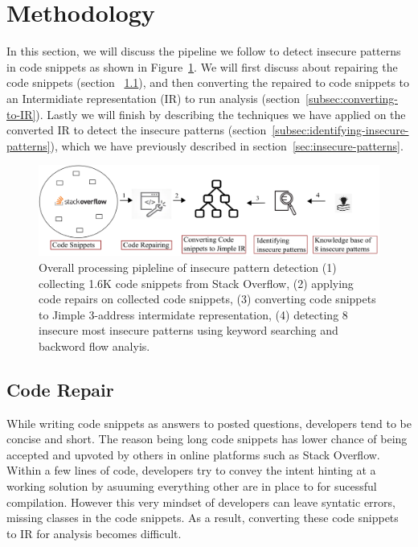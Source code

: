 \section{Methodology}
\label{sec:methodology}
In this section, we will discuss the pipeline we follow to detect insecure patterns in code snippets as shown in Figure~\ref{fig:pipeline}. We will first discuss about repairing the code snippets (section ~\ref{subsec:code-repair}), and then converting the repaired to code snippets to an Intermidiate representation (IR) to run analysis (section~\ref{subsec:converting-to-IR}). Lastly we will finish by describing the techniques we have applied on the converted IR to detect the insecure patterns (section~\ref{subsec:identifying-insecure-patterns}), which we have previously described in section~\ref{sec:insecure-patterns}.     
\begin{figure}[t]
  \centering
  \includegraphics*[width=0.8\linewidth]{Figures/overall-process.png}
  \caption{Overall processing pipleline of insecure pattern detection (1) collecting 1.6K code snippets from Stack Overflow, 
  (2) applying code repairs on collected code snippets, (3) converting code snippets to Jimple 3-address intermidate representation,
  (4) detecting 8 insecure most insecure patterns using keyword searching and backword flow analyis.}
  \label{fig:pipeline}
\end{figure}


\subsection{Code Repair}
\label{subsec:code-repair}
While writing code snippets as answers to posted questions, developers tend to be concise and short. The reason being long code snippets has lower chance of being accepted and upvoted by others in online platforms such as Stack Overflow. Within a few lines of code, developers try to convey the intent hinting at a working solution by asuuming everything other are in place to for sucessful compilation. However this very mindset of developers can leave syntatic errors, missing classes in the code snippets. As a result, converting these code snippets to IR for analysis becomes difficult.

